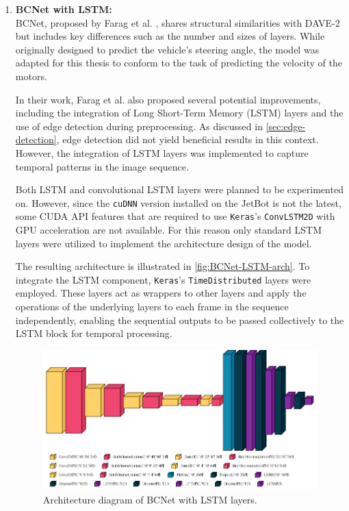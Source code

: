 \begin{enumerate}
  \item \textbf{BCNet with LSTM:} \\
    BCNet, proposed by Farag et al. \autocite{8855753}, shares structural similarities with DAVE-2 but includes key differences such as the number and sizes of layers. While originally designed to predict the vehicle’s steering angle, the model was adapted for this thesis to conform to the task of predicting the velocity of the motors.

    In their work, Farag et al. also proposed several potential improvements, including the integration of Long Short-Term Memory (LSTM) layers and the use of edge detection during preprocessing. As discussed in \autoref{sec:edge-detection}, edge detection did not yield beneficial results in this context. However, the integration of LSTM layers was implemented to capture temporal patterns in the image sequence.

    Both LSTM and convolutional LSTM layers were planned to be experimented on. However, since the \texttt{cuDNN} version installed on the JetBot is not the latest, some CUDA API features that are required to use \texttt{Keras}’s \texttt{ConvLSTM2D} with GPU acceleration are not available. For this reason only standard LSTM layers were utilized to implement the architecture design of the model.

    The resulting architecture is illustrated in \autoref{fig:BCNet-LSTM-arch}. To integrate the LSTM component, \texttt{Keras}’s \texttt{TimeDistributed} layers were employed. These layers act as wrappers to other layers and apply the operations of the underlying layers to each frame in the sequence independently, enabling the sequential outputs to be passed collectively to the LSTM block for temporal processing.

    \begin{figure}[htbp]
      \centering
      \includegraphics[width=1.0\textwidth]{Images/BCNetLSTM_architecture.png}
      \caption{Architecture diagram of BCNet with LSTM layers.}
      \label{fig:BCNet-LSTM-arch}
    \end{figure}
\end{enumerate}


